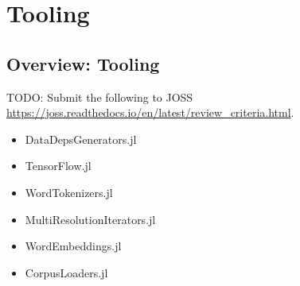 \documentclass{book}
\begin{document}
	\part{Tooling}
	
	\chapter{Overview: Tooling}
	TODO: Submit the following to JOSS	\url{https://joss.readthedocs.io/en/latest/review_criteria.html}.
	
	\begin{itemize}
		\item DataDepsGenerators.jl
		\item TensorFlow.jl
		\item WordTokenizers.jl
		\item MultiResolutionIterators.jl
		\item WordEmbeddings.jl
		\item CorpusLoaders.jl
	\end{itemize}
	
	
	
\end{document}
